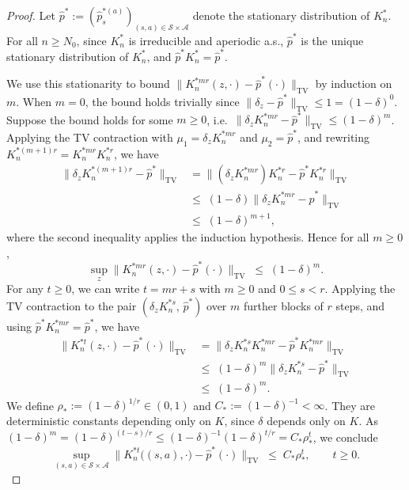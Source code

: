\documentclass{article}
\numberwithin{equation}{section}
\begin{document}
\begin{proof}
Let $\hat p^\ast:=(\hat p_s^{\ast(a)})_{(s,a) \in \mathcal S \times \mathcal A}$ denote the stationary distribution of $K_n^\ast$. 
For all $n \ge N_0$, since $K_n^\ast$ is irreducible and aperiodic a.s., $\hat p^\ast$ is the unique stationary distribution of $K_n^\ast$, and $\hat p^\ast K_n^\ast = \hat p^\ast$.

We use this stationarity to bound $\|K_n^{\ast mr}(z,\cdot)-\hat p^\ast(\cdot)\|_{\mathrm{TV}}$ by induction on $m$. When $m=0$, the bound holds trivially since $\|\delta_z-\hat p^\ast\|_{\mathrm{TV}}\le 1=(1-\delta)^0$. Suppose the bound holds for some $m\ge 0$, i.e.\ $\|\delta_z K_n^{\ast mr}-\hat p^\ast\|_{\mathrm{TV}}\le(1-\delta)^m$. Applying the TV contraction with $\mu_1=\delta_z K_n^{\ast mr}$ and $\mu_2=\hat p^\ast$, and rewriting $K_n^{\ast(m+1)r}=K_n^{\ast mr}K_n^{\ast r}$, we have
\begin{align*}
\bigl\|\delta_z K_n^{\ast(m+1)r}-\hat p^\ast\bigr\|_{\mathrm{TV}}
&= \bigl\|(\delta_z K_n^{\ast mr})K_n^{\ast r} - \hat p^\ast K_n^{\ast r}\bigr\|_{\mathrm{TV}} \\
&\le\; (1-\delta)\bigl\|\delta_z K_n^{\ast mr}-\hat p^\ast\bigr\|_{\mathrm{TV}} \\
&\le\; (1-\delta)^{m+1},
\end{align*}
where the second inequality applies the induction hypothesis. Hence for all $m\ge 0$,
\[
\sup_{z}\bigl\|K_n^{\ast mr}(z,\cdot)-\hat p^\ast(\cdot)\bigr\|_{\mathrm{TV}} \;\le\; (1-\delta)^m.
\]
For any $t\ge 0$, we can write $t=mr+s$ with $m\ge 0$ and $0\le s<r$. 
Applying the TV contraction to the pair $(\delta_z K_n^{\ast s},\,\hat p^\ast)$ over $m$ further blocks of $r$ steps, and using $\hat p^\ast K_n^{\ast mr}=\hat p^\ast$, we have
\begin{align*}
\bigl\|K_n^{\ast t}(z,\cdot)-\hat p^\ast(\cdot)\bigr\|_{\mathrm{TV}}
&= \bigl\|\delta_z K_n^{\ast s} K_n^{\ast mr} - \hat p^\ast K_n^{\ast mr}\bigr\|_{\mathrm{TV}} \\
& \le \; (1-\delta)^m \bigl\|\delta_z K_n^{\ast s}-\hat p^\ast\bigr\|_{\mathrm{TV}} \\
& \le\; (1-\delta)^m.
\end{align*}
We define $\rho_\ast:=(1-\delta)^{1/r}\in(0,1)$ and $C_\ast:=(1-\delta)^{-1}<\infty$. 
They are deterministic constants depending only on $K$, since $\delta$ depends only on $K$.
As $(1-\delta)^m=(1-\delta)^{(t-s)/r}\le(1-\delta)^{-1}(1-\delta)^{t/r}=C_\ast\rho_\ast^t$, we conclude
\[
\sup_{(s,a)\in\mathcal{S}\times\mathcal{A}}\bigl\|K_n^{\ast t}\bigl((s,a),\cdot\bigr)-\hat p^\ast(\cdot)\bigr\|_{\mathrm{TV}}
\;\le\; C_\ast\rho_\ast^t, \qquad t\ge 0.
\]


\end{proof}
\end{document}

